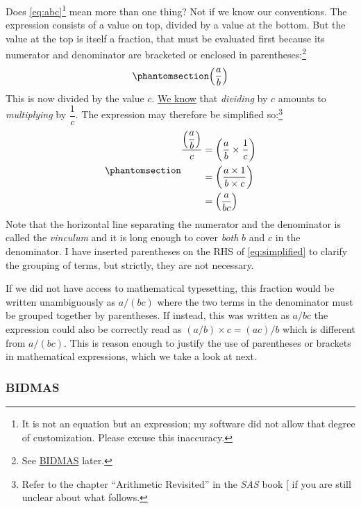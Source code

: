 \documentclass[
  a4paper,
]{article}
\begin{document}
Does \cref{eq:abc}\footnote{It is not an equation but an expression; my
  software did not allow that degree of customization. Please excuse
  this inaccuracy.} mean more than one thing? Not if we know our
conventions. The expression consists of a value on top, divided by a
value at the bottom. But the value at the top is itself a fraction, that
must be evaluated first because its numerator and denominator are
bracketed or enclosed in parentheses:\footnote{See
  \hyperref[bidmas]{BIDMAS} later.}
\begin{equation}\phantomsection\label{eq:a-over-b}{
\left(\dfrac{a}{b}\right)
}\end{equation} This is now divided by the value \(c\).
\href{https://swanlotus.netlify.app/blogs/the-two-most-important-numbers-zero-and-one\#the-multiplicative-inverse-in-mathbbz-mathbbq-and-mathbbr}{We
know} that \emph{dividing} by \(c\) amounts to \emph{multiplying} by
\(\dfrac{1}{c}\). The expression may therefore be simplified
so:\footnote{Refer to the chapter ``Arithmetic Revisited'' in the
  \emph{SAS} book {[}\citeproc{ref-sas}{1}{]} if you are still unclear
  about what follows.}
\begin{equation}\phantomsection\label{eq:simplified}{
\begin{aligned}
\dfrac{\left(\dfrac{a}{b}\right)}{c} &= \left(\dfrac{a}{b} \times \dfrac{1}{c}\right)\\
&= \left(\dfrac{a \times 1}{b \times c}\right)\\
&= \left(\dfrac{a}{bc}\right)
\end{aligned}
}\end{equation} Note that the horizontal line separating the numerator
and the denominator is called the \emph{vinculum} and it is long enough
to cover \emph{both} \(b\) and \(c\) in the denominator. I have inserted
parentheses on the RHS of \cref{eq:simplified} to clarify the grouping
of terms, but strictly, they are not necessary.

If we did not have access to mathematical typesetting, this fraction
would be written unambiguously as \(a/(bc)\) where the two terms in the
denominator must be grouped together by parentheses. If instead, this
was written as \(a/bc\) the expression could also be correctly read as
\((a/b) \times c = (ac)/b\) which is different from \(a/(bc)\). This is
reason enough to justify the use of parentheses or brackets in
mathematical expressions, which we take a look at next.

\subsubsection{BIDMAS}\label{bidmas}
\end{document}
